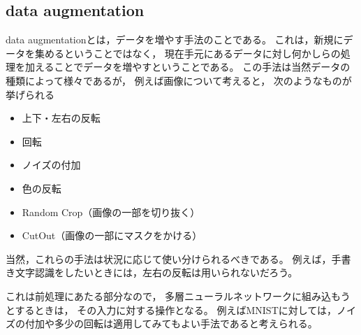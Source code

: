 \documentclass[class=jsarticle, crop=false, dvipdfmx, fleqn]{standalone}
\begin{document}
\subsection*{data augmentation}

data augmentationとは，データを増やす手法のことである。
これは，新規にデータを集めるということではなく，
現在手元にあるデータに対し何かしらの処理を加えることでデータを増やすということである。
この手法は当然データの種類によって様々であるが，
例えば画像について考えると，
次のようなものが挙げられる

\begin{itemize}
    \item 上下・左右の反転
    \item 回転
    \item ノイズの付加
    \item 色の反転
    \item Random Crop（画像の一部を切り抜く）
    \item CutOut（画像の一部にマスクをかける）
\end{itemize}

当然，これらの手法は状況に応じて使い分けられるべきである。
例えば，手書き文字認識をしたいときには，左右の反転は用いられないだろう。

これは前処理にあたる部分なので，
多層ニューラルネットワークに組み込もうとするときは，
その入力に対する操作となる。
例えばMNISTに対しては，ノイズの付加や多少の回転は適用してみてもよい手法であると考えられる。
\end{document}
